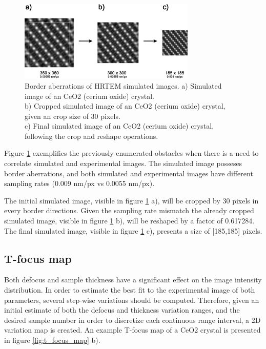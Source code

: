\documentclass[
  oneside,
  11pt, a4paper,
  footinclude=true,
  headinclude=true,
  cleardoublepage=empty
]{scrbook}
\begin{document}
	
	
		\begin{figure}[!ht]
	\begin{center}
		\includegraphics[width=0.75\textwidth]{img/sampling_rate_and_ignore_edges}
				\caption[Border aberrations of HRTEM simulated images]{Border aberrations of HRTEM simulated images.\newline 
				a) Simulated image of an CeO2 (cerium oxide) crystal.\\
			b) Cropped simulated image of an CeO2 (cerium oxide) crystal, given an crop size of 30 pixels.\\
			c) Final simulated image of an CeO2 (cerium oxide) crystal, following the crop and reshape operations.
			}
	\label{fig:sim_image_crop_factor}
	\end{center}
	\end{figure}
	
	
	
	Figure \ref{fig:sim_image_crop_factor} exemplifies the previously enumerated obstacles when there is a need to correlate simulated and experimental images. The simulated image posseses border aberrations, and both simulated and experimental images have different sampling rates (0.009 nm/px vs 0.0055 nm/px).\par 
	The initial simulated image, visible in figure \ref{fig:sim_image_crop_factor} a), will be cropped  by 30 pixels in every border directions. Given the sampling rate mismatch the already cropped simulated image, visible in figure \ref{fig:sim_image_crop_factor} b), will be reshaped  by a factor of 0.617284. The final simulated image, visible in figure \ref{fig:sim_image_crop_factor} c), presents a size of [185,185] pixels.
	
	
	

			
	
\subsection{T-focus map}
	

Both defocus and sample thickness have a significant effect on the image intensity distribution. In order to estimate the best fit to the experimental image of both parameters, several step-wise variations should be computed. Therefore, given an initial estimate of both the defocus and thickness variation ranges, and the desired sample number in order to discretize each continuous range interval, a 2D variation map is created. An example T-focus map of a CeO2 crystal is presented in figure \ref{fig:t_focus_map} b). 
\end{document}
